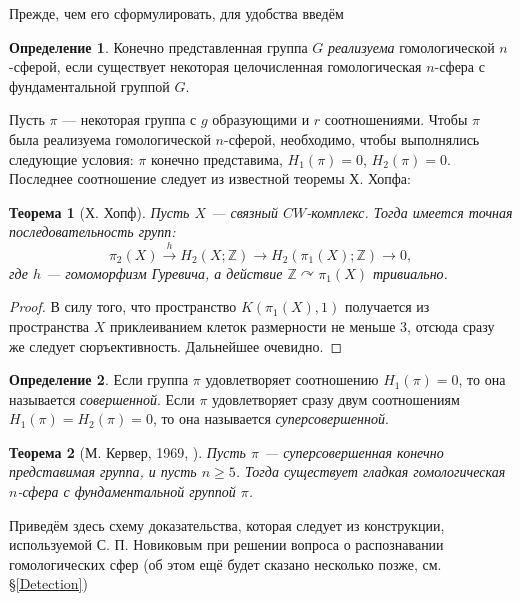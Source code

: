 \documentclass[14pt, dvipsnames]{extarticle}
\newtheorem{theorem}{Теорема}
\theoremstyle{definition}
\newtheorem{defi}{Определение}
\theoremstyle{remark}
\begin{document}
Прежде, чем его сформулировать, для удобства введём 

\begin{defi}
Конечно представленная группа $G$ {\it реализуема} гомологической $n$-сферой, если существует некоторая целочисленная гомологическая $n$-сфера с фундаментальной группой $G$.  
\end{defi}

Пусть $\pi$ --- некоторая группа с $g$ образующими и $r$ соотношениями. Чтобы $\pi$ была реализуема гомологической $n$-сферой, необходимо, чтобы выполнялись следующие условия: $\pi$ конечно представима, $H_1(\pi)=0$, $H_2(\pi)=0$. Последнее соотношение следует из известной теоремы Х. Хопфа:

\begin{theorem}[Х. Хопф]
Пусть $X$ --- связный $CW$-комплекс. Тогда имеется точная последовательность групп: $$\pi_2(X)\overset{h}{\to} H_2(X; \mathbb{Z})\to H_2(\pi_1(X); \mathbb{Z})\to 0,$$ где $h$ --- гомоморфизм Гуревича, а действие $\mathbb{Z}\curvearrowright \pi_1(X)$ тривиально.
\end{theorem}   

\begin{proof}
В силу того, что пространство $K(\pi_1(X), 1)$ получается из пространства $X$ приклеиванием клеток размерности не меньше 3, отсюда сразу же следует сюръективность. Дальнейшее очевидно.
\end{proof}



\begin{defi}
Если группа $\pi$ удовлетворяет соотношению $H_1(\pi)=0$, то она называется {\it совершенной}. Если $\pi$ удовлетворяет сразу двум соотношениям $H_1(\pi)=H_2(\pi)=0$, то она называется {\it суперсовершенной}.
\end{defi}

\begin{theorem}[М. Кервер, 1969, \cite{Kervaire}]\label{high_dim}
Пусть $\pi$ --- суперсовершенная конечно представимая группа, и пусть $n\geqslant 5$. Тогда существует гладкая гомологическая $n$-сфера с фундаментальной группой $\pi$.
\end{theorem}


Приведём здесь схему доказательства, которая следует из конструкции, используемой С. П. Новиковым при решении вопроса о распознавании гомологических сфер (об этом ещё будет сказано несколько позже, см. \S\ref{Detection})
\end{document}
